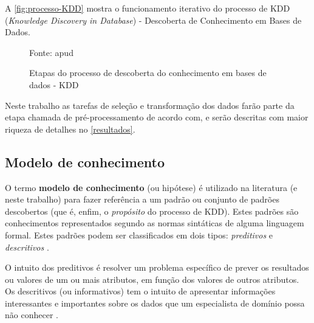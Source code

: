 A \autoref{fig:processo-KDD} mostra o funcionamento iterativo do processo de KDD (\textit{Knowledge Discovery in Database}) -  Descoberta de Conhecimento em Bases de Dados.

\begin{figure}[h!]
	\centering
	\caption{Etapas do processo de descoberta do conhecimento em bases de dados - KDD}
	
	{\scriptsize Fonte:  apud }
	\label{fig:processo-KDD}
\end{figure}

Neste trabalho as tarefas de seleção e transformação dos dados farão parte da etapa chamada de pré-processamento de acordo com,  e serão descritas com maior riqueza de detalhes no \autoref{resultados}.

\subsection{Modelo de conhecimento}\label{modelo_conhecimento}
O termo \textbf{modelo de conhecimento} (ou hipótese) é utilizado na literatura (e neste trabalho) para fazer referência a um padrão ou conjunto de padrões descobertos (que é, enfim, o \textit{propósito} do processo de KDD). Estes padrões são conhecimentos representados segundo as normas sintáticas de alguma linguagem formal. Estes padrões podem ser classificados em dois tipos: \textit{preditivos} e \textit{descritivos} \cite{ferrari2017}.

O intuito dos preditivos é resolver um problema específico de prever os resultados ou valores de um ou mais atributos, em função dos valores de outros atributos. Os descritivos (ou informativos) tem o intuito de apresentar informações interessantes e importantes sobre os dados que um especialista de domínio possa não conhecer \cite{goldschmidt2005}. 

